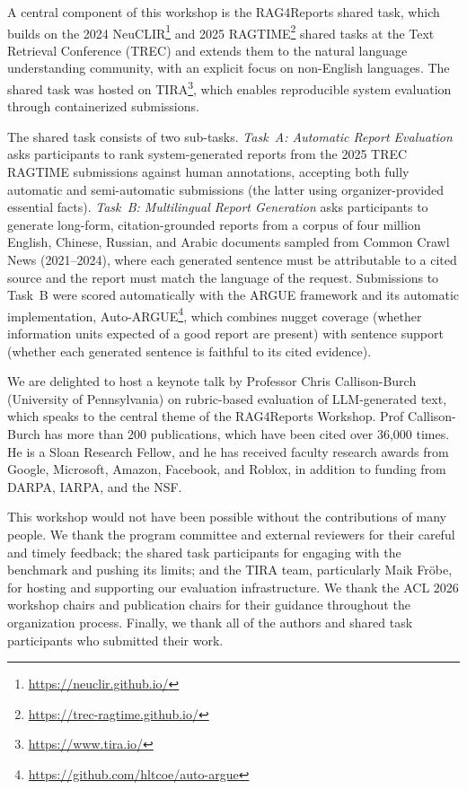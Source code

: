 A central component of this workshop is the RAG4Reports shared task, which
builds on the 2024 NeuCLIR\footnote{\url{https://neuclir.github.io/}} and 
2025 RAGTIME\footnote{\url{https://trec-ragtime.github.io/}} shared tasks at the Text
Retrieval Conference (TREC) and extends them to the natural language
understanding community, with an explicit focus on non-English languages.
The shared task was hosted on TIRA\footnote{\url{https://www.tira.io/}},
which enables reproducible system evaluation through containerized
submissions.

The shared task consists of two sub-tasks. \emph{Task~A: Automatic Report
Evaluation} asks participants to rank system-generated reports from the
2025 TREC RAGTIME submissions against human annotations, accepting both
fully automatic and semi-automatic submissions (the latter using
organizer-provided essential facts). \emph{Task~B: Multilingual Report
Generation} asks participants to generate long-form, citation-grounded
reports from a corpus of four million English, Chinese, Russian, and Arabic
documents sampled from Common Crawl News (2021--2024), where each generated
sentence must be attributable to a cited source and the report must match
the language of the request. Submissions to Task~B were scored
automatically with the ARGUE framework and
its automatic implementation, Auto-ARGUE\footnote{\url{https://github.com/hltcoe/auto-argue}}, 
which combines nugget coverage
(whether information units expected of a good report are present) with
sentence support (whether each generated sentence is faithful to its cited
evidence).

We are delighted to host a keynote talk by Professor Chris Callison-Burch (University
of Pennsylvania) on rubric-based evaluation of LLM-generated text, which speaks to the
central theme of the RAG4Reports Workshop. Prof Callison-Burch has more than 200
publications, which have been cited over 36,000 times. He is a Sloan Research Fellow,
and he has received faculty research awards from Google, Microsoft, Amazon, Facebook,
and Roblox, in addition to funding from DARPA, IARPA, and the NSF.

This workshop would not have been possible without the contributions of many
people. We thank the program committee and external reviewers for their
careful and timely feedback; the shared task participants for engaging with
the benchmark and pushing its limits; and the TIRA team, particularly Maik Fröbe,
for hosting and supporting our evaluation infrastructure. 
We thank the ACL 2026 workshop chairs and
publication chairs for their guidance throughout the organization process. 
Finally, we thank all of the authors and shared task participants who submitted
their work. 

